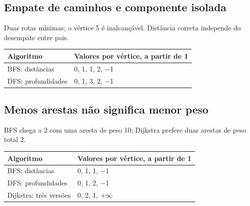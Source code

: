 \documentclass[a4paper,12pt]{article}
\begin{document}
\par\noindent\begin{minipage}{\textwidth}\subsection{Empate de caminhos e componente isolada}
Duas rotas mínimas; o vértice 5 é inalcançável. Distância correta independe do desempate entre pais.
\par\smallskip\noindent\begin{minipage}{\textwidth}\centering
\begingroup\small
\setlength{\tabcolsep}{4pt}
\begin{tabular}{l>{\raggedright\arraybackslash}p{10.4cm}}
\toprule
Algoritmo & Valores por vértice, a partir de 1 \\
\midrule
BFS: distâncias & \num{0}, \num{1}, \num{1}, \num{2}, \num{-1} \\
DFS: profundidades & \num{0}, \num{1}, \num{3}, \num{2}, \num{-1} \\
\bottomrule
\end{tabular}
\endgroup
\end{minipage}\par\smallskip
\end{minipage}\par\medskip
\par\noindent\begin{minipage}{\textwidth}\subsection{Menos arestas não significa menor peso}
BFS chega a 2 com uma aresta de peso 10; Dijkstra prefere duas arestas de peso total 2.
\par\smallskip\noindent\begin{minipage}{\textwidth}\centering
\begingroup\small
\setlength{\tabcolsep}{4pt}
\begin{tabular}{l>{\raggedright\arraybackslash}p{10.4cm}}
\toprule
Algoritmo & Valores por vértice, a partir de 1 \\
\midrule
BFS: distâncias & \num{0}, \num{1}, \num{1}, \num{-1} \\
DFS: profundidades & \num{0}, \num{1}, \num{2}, \num{-1} \\
Dijkstra: três versões & \num{0}, \num{2}, \num{1}, $+\infty$ \\
\bottomrule
\end{tabular}
\endgroup
\end{minipage}\par\smallskip
\end{minipage}\par\medskip
\end{document}
